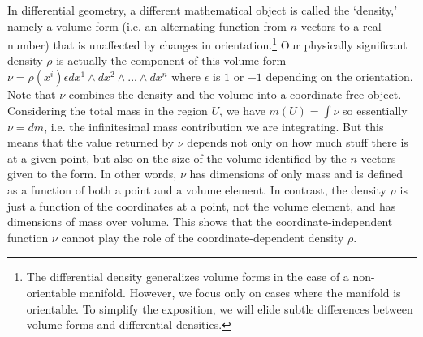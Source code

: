 \documentclass[letterpaper]{article}
\begin{document}
In differential geometry, a different mathematical object is called the `density,' namely a volume form (i.e. an alternating function from $n$ vectors to a real number) that is unaffected by changes in orientation.\footnote{The differential density generalizes volume forms in the case of a non-orientable manifold. However, we focus only on cases where the manifold is orientable. To simplify the exposition, we will elide subtle differences between volume forms and differential densities.} Our physically significant density $\rho$ is actually the component of this volume form $\nu = \rho(x^i)  \epsilon dx^1 \wedge dx^2 \wedge ... \wedge dx^n$ where $\epsilon$ is $1$ or $-1$ depending on the orientation. Note that $\nu$ combines the density and the volume into a coordinate-free object. Considering the total mass in the region $U$, we have $m(U) = \int \nu$ so essentially $\nu = dm$, i.e. the infinitesimal mass contribution we are integrating. But this means that the value returned by $\nu$ depends not only on how much stuff there is at a given point, but also on the size of the volume identified by the $n$ vectors given to the form. In other words, $\nu$ has dimensions of only mass and is defined as a function of both a point and a volume element. In contrast, the density $\rho$ is just a function of the coordinates at a point, not the volume element, and has dimensions of mass over volume. This shows that the coordinate-independent function $\nu$ cannot play the role of the coordinate-dependent density $\rho$. 
\end{document}
